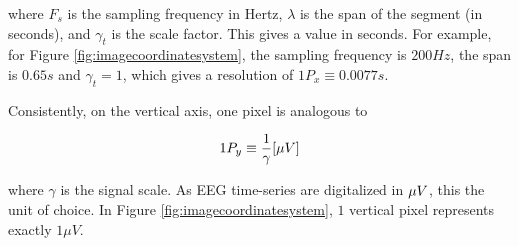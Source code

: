 \noindent where $F_s$ is the sampling frequency in Hertz, $\lambda$ is the span of the segment (in seconds), and $\gamma_t$ is the scale factor.  This gives a value in seconds.  For example, for Figure \ref{fig:imagecoordinatesystem}, the sampling frequency is $200 Hz$, the span is $0.65 s$ and $\gamma_t = 1$, which gives a resolution of $1 P_x \equiv 0.0077 s$. 

Consistently, on the vertical axis, one pixel is analogous to 

\begin{equation}
1 P_y \equiv \frac{1}{\gamma}  [\si\mu{V}]
\label{eq:resolutiony}
\end{equation}

\noindent where $\gamma$ is the signal scale.  As EEG time-series are digitalized in $\si\mu{V}$, this the unit of choice.  In Figure \ref{fig:imagecoordinatesystem}, $1$ vertical pixel represents exactly $1 \mu V$.
